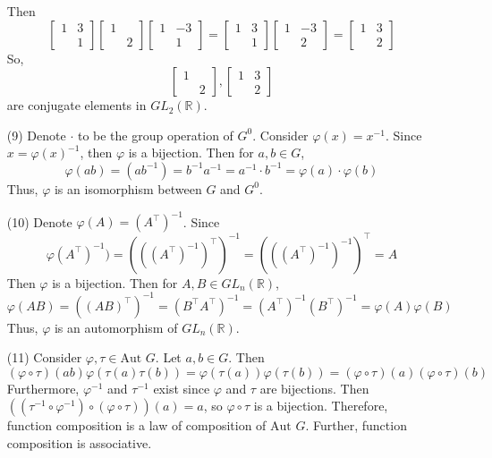 \begin{itemize}
Then
$$\begin{bmatrix}
1 & 3 \\
& 1
\end{bmatrix}\begin{bmatrix}
1 \\
& 2
\end{bmatrix}\begin{bmatrix}
1 & -3 \\
& 1
\end{bmatrix} = \begin{bmatrix}
1 & 3 \\
& 1
\end{bmatrix}\begin{bmatrix}
1 & -3 \\
& 2
\end{bmatrix} = \begin{bmatrix}
1 & 3 \\
& 2
\end{bmatrix}$$
So,
$$\begin{bmatrix}
1 \\
& 2
\end{bmatrix}, \begin{bmatrix}
1 & 3 \\
& 2
\end{bmatrix}$$
are conjugate elements in $GL_2(\mathbb{R})$.
\item[(9)]
Denote $\cdot$ to be the group operation of $G^0$. Consider $\varphi(x) = x^{-1}$. Since $x = \varphi(x)^{-1}$, then $\varphi$ is a bijection. Then for $a, b \in G$,
$$\varphi(ab) = (ab^{-1}) = b^{-1}a^{-1} = a^{-1} \cdot b^{-1} = \varphi(a) \cdot \varphi(b)$$
Thus, $\varphi$ is an isomorphism between $G$ and $G^0$.
\item[(10)]
Denote $\varphi(A) = (A^\top)^{-1}$. Since 
$$\varphi(A^\top)^{-1}) = (((A^\top)^{-1})^\top)^{-1} = (((A^\top)^{-1})^{-1})^\top = A$$
Then $\varphi$ is a bijection. Then for $A, B \in GL_n(\mathbb{R})$,
$$\varphi(AB) = ((AB)^\top)^{-1} = (B^\top A^\top)^{-1} = (A^\top)^{-1}(B^\top)^{-1} = \varphi(A)\varphi(B)$$
Thus, $\varphi$ is an automorphism of $GL_n(\mathbb{R})$.
\item[(11)]
Consider $\varphi, \tau \in \text{Aut }G$. Let $a, b \in G$. Then
$$(\varphi \circ \tau)(ab) \varphi(\tau(a)\tau(b)) = \varphi(\tau(a))\varphi(\tau(b)) = (\varphi \circ \tau)(a)(\varphi \circ \tau)(b)$$
Furthermore, $\varphi^{-1}$ and $\tau^{-1}$ exist since $\varphi$ and $\tau$ are bijections. Then $((\tau^{-1} \circ \varphi^{-1}) \circ (\varphi \circ \tau))(a) = a$, so $\varphi \circ \tau$ is a bijection. Therefore, function composition is a law of composition of $\text{Aut }G$. Further, function composition is associative. 


\end{itemize}
